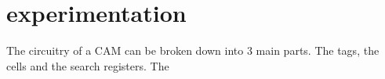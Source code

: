 \section{experimentation}
The circuitry of a CAM can be broken down into 3 main parts. The tags, the cells and the search registers. The